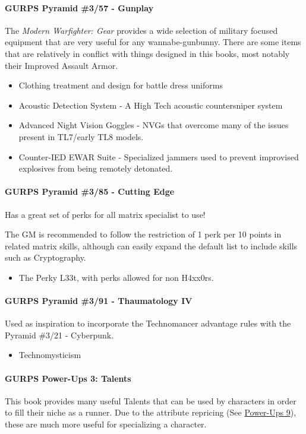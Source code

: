 \begin{multicols*}{3}
	\paragraph{GURPS Pyramid \#3/57 - Gunplay}\label{pyramid_357}
	The \textit{Modern Warfighter: Gear} provides a wide selection of military focused equipment that are very useful for any wannabe-gunbunny. There are some items that are relatively in conflict with things designed in this books, most notably their Improved Assault Armor.
	\begin{itemize}
		\itemsep 0pt
		\item Clothing treatment and design for battle dress uniforms
		\item Acoustic Detection System - A High Tech acoustic countersniper system
		\item Advanced Night Vision Goggles - NVGs that overcome many of the issues present in TL7/early TL8 models.
		\item Counter-IED EWAR Suite - Specialized jammers used to prevent improvised explosives from being remotely detonated.
	\end{itemize}
	
	\paragraph{GURPS Pyramid \#3/85 - Cutting Edge}
	Has a great set of perks for all matrix specialist to use! 
	
	The GM is recommended to follow the restriction of 1 perk per 10 points in related matrix skills, although can easily expand the default list to include skills such as Cryptography.
	
	\begin{itemize}
		\itemsep0em 
		\item The Perky L33t, with perks allowed for non H4xx0rs.
	\end{itemize}

	\paragraph{GURPS Pyramid \#3/91 - Thaumatology IV}
	Used as inspiration to incorporate the Technomancer advantage rules with the Pyramid \#3/21 - Cyberpunk.
	
	\begin{itemize}
		\itemsep 0pt
		\item Technomysticism
	\end{itemize}
	
	\paragraph{GURPS Power-Ups 3: Talents}
	This book provides many useful Talents that can be used by characters in order to fill their niche as a runner. Due to the attribute repricing (See \hyperref[PU9]{Power-Ups 9}), these are much more useful for specializing a character.
	

\end{multicols*}
